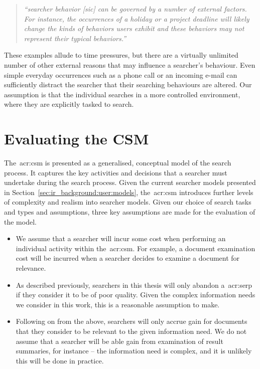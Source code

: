 \begin{quote}
    \emph{``searcher behavior [sic] can be governed by a number of external factors. For instance, the occurrences of a holiday or a project deadline will likely change the kinds of behaviors users exhibit and these behaviors may not represent their typical behaviors.''}
\end{quote}

These examples allude to time pressures, but there are a virtually unlimited number of other external reasons that may influence a searcher's behaviour. Even simple everyday occurrences such as a phone call or an incoming e-mail can sufficiently distract the searcher that their searching behaviours are altered. Our assumption is that the individual searches in a more controlled environment, where they are explicitly tasked to search.

\section{Evaluating the CSM}\label{sec:csm:evaluation}
The~\gls{acr:csm} is presented as a generalised, conceptual model of the search process. It captures the key activities and decisions that a searcher must undertake during the search process. Given the current searcher models presented in Section~\ref{sec:ir_background:user:models}, the~\gls{acr:csm} introduces further levels of complexity and realism into searcher models. Given our choice of search tasks and types and assumptions, three key assumptions are made for the evaluation of the model.

\begin{itemize}
    \item{ We assume that a searcher will incur some cost when performing an individual activity within the~\gls{acr:csm}. For example, a document examination cost will be incurred when a searcher decides to examine a document for relevance.}
    \item{ As described previously, searchers in this thesis will only abandon a~\gls{acr:serp} if they consider it to be of poor quality. Given the complex information needs we consider in this work, this is a reasonable assumption to make.}
    \item{ Following on from the above, searchers will only accrue gain for documents that they consider to be relevant to the given information need. We do not assume that a searcher will be able gain from examination of result summaries, for instance -- the information need is complex, and it is unlikely this will be done in practice.}
\end{itemize}

